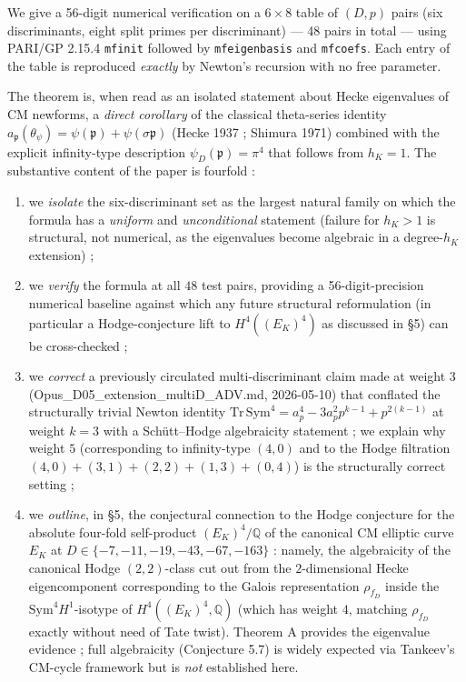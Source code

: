 \documentclass[
  11pt,
  a4paper,
]{amsart}
\begin{document}
We give a 56-digit numerical verification on a \(6 \times 8\) table of \((D, p)\) pairs (six discriminants, eight split primes per discriminant) --- 48 pairs in total --- using PARI/GP 2.15.4 \texttt{mfinit} followed by \texttt{mfeigenbasis} and \texttt{mfcoefs}. Each entry of the table is reproduced \emph{exactly} by Newton's recursion with no free parameter.

The theorem is, when read as an isolated statement about Hecke eigenvalues of CM newforms, a \emph{direct corollary} of the classical theta-series identity \(a_\mathfrak{p}(\theta_\psi) = \psi(\mathfrak{p}) + \psi(\sigma\mathfrak{p})\) (Hecke 1937 ; Shimura 1971) combined with the explicit infinity-type description \(\psi_D(\mathfrak{p}) = \pi^4\) that follows from \(h_K = 1\). The substantive content of the paper is fourfold :

\begin{enumerate}
\def\labelenumi{(\roman{enumi})}
\item
  we \emph{isolate} the six-discriminant set as the largest natural family on which the formula has a \emph{uniform} and \emph{unconditional} statement (failure for \(h_K > 1\) is structural, not numerical, as the eigenvalues become algebraic in a degree-\(h_K\) extension) ;
\item
  we \emph{verify} the formula at all \(48\) test pairs, providing a 56-digit-precision numerical baseline against which any future structural reformulation (in particular a Hodge-conjecture lift to \(H^4((E_K)^4)\) as discussed in §5) can be cross-checked ;
\item
  we \emph{correct} a previously circulated multi-discriminant claim made at weight 3 (Opus\_D05\_extension\_multiD\_ADV.md, 2026-05-10) that conflated the structurally trivial Newton identity \(\mathrm{Tr\,Sym}^4 = a_p^4 - 3 a_p^2 p^{k-1} + p^{2(k-1)}\) at weight \(k = 3\) with a Schütt--Hodge algebraicity statement ; we explain why weight \(5\) (corresponding to infinity-type \((4, 0)\) and to the Hodge filtration \((4, 0) + (3, 1) + (2, 2) + (1, 3) + (0, 4)\)) is the structurally correct setting ;
\item
  we \emph{outline}, in §5, the conjectural connection to the Hodge conjecture for the absolute four-fold self-product \((E_K)^4 / \mathbb{Q}\) of the canonical CM elliptic curve \(E_K\) at \(D \in \{-7, -11, -19, -43, -67, -163\}\) : namely, the algebraicity of the canonical Hodge \((2, 2)\)-class cut out from the \(2\)-dimensional Hecke eigencomponent corresponding to the Galois representation \(\rho_{f_D}\) inside the \(\mathrm{Sym}^4 H^1\)-isotype of \(H^4((E_K)^4, \mathbb{Q})\) (which has weight \(4\), matching \(\rho_{f_D}\) exactly without need of Tate twist). Theorem A provides the eigenvalue evidence ; full algebraicity (Conjecture 5.7) is widely expected via Tankeev's CM-cycle framework but is \emph{not} established here.
\end{enumerate}
\end{document}

